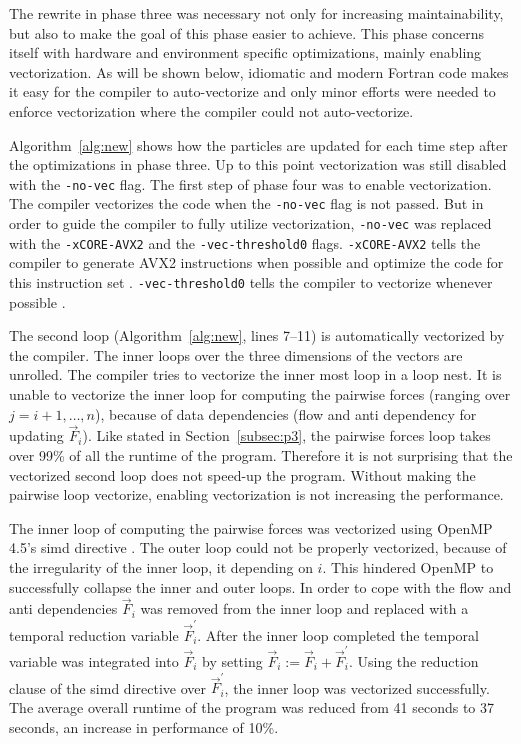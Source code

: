 \documentclass[twoside,11pt]{article}
\begin{document}
The rewrite in phase three was necessary not only for increasing
maintainability, but also to make the goal of this phase easier to
achieve.
This phase concerns itself with hardware and environment specific
optimizations, mainly enabling vectorization.
As will be shown below, idiomatic and modern Fortran code makes it
easy for the compiler to auto-vectorize and only minor efforts were
needed to enforce vectorization where the compiler could not
auto-vectorize.

Algorithm~\ref{alg:new} shows how the particles are updated for each
time step after the optimizations in phase three.
Up to this point vectorization was still disabled with the
\texttt{-no-vec} flag.
The first step of phase four was to enable vectorization.
The compiler vectorizes the code when the \texttt{-no-vec} flag is
not passed.
But in order to guide the compiler to fully utilize vectorization,
\texttt{-no-vec} was replaced with the \texttt{-xCORE-AVX2} and the
\texttt{-vec-threshold0} flags.
\texttt{-xCORE-AVX2} tells the compiler to generate AVX2 instructions
when possible and optimize the code for this instruction set
\citep{xcore_avx2}.
\texttt{-vec-threshold0} tells the compiler to vectorize whenever
possible \citep{vec_threshold0}.

The second loop (Algorithm~\ref{alg:new}, lines 7--11)
is automatically vectorized by the compiler.
The inner loops over the three dimensions of the vectors are unrolled.
The compiler tries to vectorize the inner most loop in a loop nest.
It is unable to vectorize the inner loop for computing the pairwise
forces (ranging over $j=i+1,\dots,n$), because of data dependencies
(flow and anti dependency for updating $\vec{F}_i$).
Like stated in Section~\ref{subsec:p3}, the pairwise forces loop takes
over 99\% of all the runtime of the program.
Therefore it is not surprising that the vectorized second loop does
not speed-up the program.
Without making the pairwise loop vectorize, enabling vectorization is
not increasing the performance.

The inner loop of computing the pairwise forces was vectorized using
OpenMP 4.5's simd directive \citep{omp}.
The outer loop could not be properly vectorized, because of the
irregularity of the inner loop, it depending on $i$.
This hindered OpenMP to successfully collapse the inner and outer
loops.
In order to cope with the flow and anti dependencies $\vec{F}_i$ was
removed from the inner loop and replaced with a temporal reduction
variable $\vec{F}^\prime_i$.
After the inner loop completed the temporal variable was integrated
into $\vec{F}_i$ by setting
$\vec{F}_i := \vec{F}_i + \vec{F}^\prime_i$.
Using the reduction clause of the simd directive over
$\vec{F}^\prime_i$, the inner loop was vectorized successfully.
The average overall runtime of the program was reduced from 41 seconds
to 37 seconds, an increase in performance of 10\%.
\end{document}
